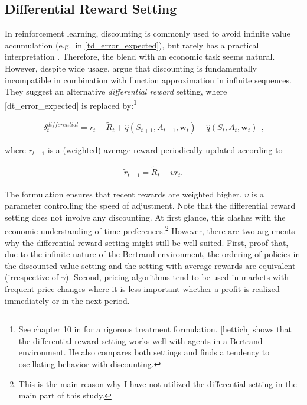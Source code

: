 		
\subsection{Differential Reward Setting}

In reinforcement learning, discounting is commonly used to avoid infinite value accumulation (e.g.\ in \autoref{td_error_expected}), but rarely has a practical interpretation \parencite{schwartz_reinforcement_1993}. Therefore, the blend with an economic task seems natural. However, despite wide usage, \textcite{naik_discounted_2019} argue that discounting is fundamentally incompatible in combination with function approximation in infinite sequences. They suggest an alternative \emph{differential reward} setting, where \autoref{dt_error_expected} is replaced by:\footnote{See chapter 10 in \textcite{sutton_reinforcement_2018} for a rigorous treatment formulation. \autoref{hettich} shows that the differential reward setting works well with agents in a Bertrand environment. He also compares both settings and finds a tendency to oscillating behavior with discounting.}


\begin{gather}\label{differential_reward}
\delta_t^{differential} = r_t - \widetilde{R}_{t} + \hat{q}(S_{t+1}, A_{t+1}, \boldsymbol{w}_t) - \hat{q}(S_t, A_t, \boldsymbol{w}_t) ~~  \text{,}
\end{gather}

where $\widetilde{r}_{t-1}$ is a (weighted) average reward periodically updated according to

\begin{gather}
	\widetilde{r}_{t+1} = \widetilde{R}_t + \upsilon r_t\text{.}
\end{gather}

The formulation ensures that recent rewards are weighted higher. $\upsilon$ is a parameter controlling the speed of adjustment. Note that the differential reward setting does not involve any discounting. At first glance, this clashes with the economic understanding of time preferences.\footnote{This is the main reason why I have not utilized the differential setting in the main part of this study.} However, there are two arguments why the differential reward setting might still be well suited. First, \textcite{sutton_reinforcement_2018} proof that, due to the infinite nature of the Bertrand environment, the ordering of policies in the discounted value setting and the setting with average rewards are equivalent (irrespective of $\gamma$). Second, pricing algorithms tend to be used in markets with frequent price changes where it is less important whether a profit is realized immediately or in the next period.


